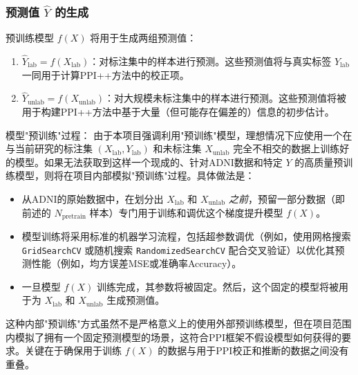 \documentclass[12pt,a4paper]{article}
\begin{document}
\subsubsection{预测值 $\hat{Y}$ 的生成}
\label{sec:y_hat_generation}
预训练模型 $f(X)$ 将用于生成两组预测值：
\begin{enumerate}
    \item $\hat{Y}_{\text{lab}} = f(X_{\text{lab}})$：对标注集中的样本进行预测。这些预测值将与真实标签 $Y_{\text{lab}}$ 一同用于计算PPI++方法中的校正项。
    \item $\hat{Y}_{\text{unlab}} = f(X_{\text{unlab}})$：对大规模未标注集中的样本进行预测。这些预测值将被用于构建PPI++方法中基于大量（但可能存在偏差的）信息的初步估计。
\end{enumerate}
模型"预训练"过程：
由于本项目强调利用"预训练"模型，理想情况下应使用一个在与当前研究的标注集 $(X_{\text{lab}},Y_{\text{lab}})$ 和未标注集 $X_{\text{unlab}}$ 完全不相交的数据上训练好的模型。如果无法获取到这样一个现成的、针对ADNI数据和特定 $Y$ 的高质量预训练模型，则将在项目内部模拟"预训练"过程。具体做法是：
\begin{itemize}
    \item 从ADNI的原始数据中，在划分出 $X_{\text{lab}}$ 和 $X_{\text{unlab}}$ \textit{之前}，预留一部分数据（即前述的 $N_{\text{pretrain}}$ 样本）专门用于训练和调优这个梯度提升模型 $f(X)$。
    \item 模型训练将采用标准的机器学习流程，包括超参数调优（例如，使用网格搜索 \texttt{GridSearchCV} 或随机搜索 \texttt{RandomizedSearchCV} 配合交叉验证）以优化其预测性能（例如，均方误差MSE或准确率Accuracy）。
    \item 一旦模型 $f(X)$ 训练完成，其参数将被固定。然后，这个固定的模型将被用于为 $X_{\text{lab}}$ 和 $X_{\text{unlab}}$ 生成预测值。
\end{itemize}
这种内部"预训练"方式虽然不是严格意义上的使用外部预训练模型，但在项目范围内模拟了拥有一个固定预测模型的场景，这符合PPI框架不假设模型如何获得的要求。关键在于确保用于训练 $f(X)$ 的数据与用于PPI校正和推断的数据之间没有重叠。
\end{document}
